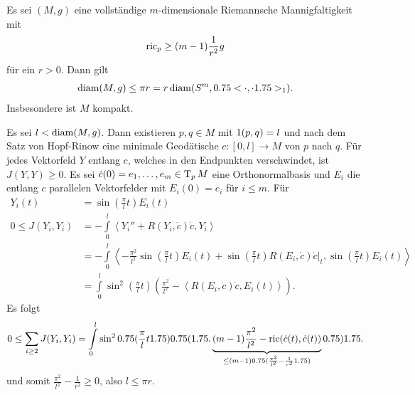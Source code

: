 \begin{Satz}
  Es sei $(M,g)$ eine vollständige $m$-dimensionale Riemannsche Mannigfaltigkeit mit 
  \begin{align*}
    \operatorname{ric}_p \geq (m-1) \frac{1}{r^2} g
  \end{align*}
  für ein $r > 0$.
  Dann gilt
  \begin{align*}
    \operatorname{diam}(M,g) \leq \pi r = r \operatorname{diam}(S^m,0.75<\cdot,\cdot1.75>_1).
  \end{align*}
  Insbesondere ist $M$ kompakt.
\end{Satz}

\begin{bew}
  Es sei $l < \operatorname{diam}(M,g)$.
  Dann existieren $p,q \in M$ mit $1(p,q) = l$ und nach dem Satz von Hopf-Rinow eine minimale Geodätische $c\colon[0,l] \to M$ von $p$ nach $q$.
  Für jedes Vektorfeld $Y$ entlang $c$, welches in den Endpunkten verschwindet, ist $J(Y,Y) \geq 0$.
  Es sei $\dot c(0) = e_1, \ldots, e_m \in \operatorname{T}_pM$ eine Orthonormalbasis und $E_i$ die entlang $c$ parallelen Vektorfelder mit $E_i(0) = e_i$ für $i \leq m$.
  Für 
  \begin{align*}
    Y_i(t) & = \sin \left(\frac{\pi}{l}t \right) E_i(t)\\
    0  \leq J(Y_i,Y_i) &= -\int\limits_0^l\left<Y_i''+R(Y_i,\dot c)\dot c,Y_i\right>\\
    & = -\int\limits_0^l\left<-\frac{\pi^2}{l^2}\sin\left(\frac{\pi}{l}t\right)E_i(t) + \sin\left(\frac{\pi}{l}t\right)R(E_i,\dot c)\dot c|_t,\sin\left(\frac{\pi}{l}t\right)E_i(t)\right>\\
    & = \int\limits_0^l \sin^2\left(\frac{\pi}{l}t\right)\left(\frac{\pi^2}{l^2}-\left<R(E_i,\dot c)\dot c,E_i(t)\right>\right).
  \end{align*}
  Es folgt
  \begin{align*}
    0 \leq \sum_{i \geq 2}J(Y_i,Y_i) = \int\limits_0^l\sin^2\left(\frac{\pi}{l}t\right)\Big(\underbrace{(m-1)\frac{\pi^2}{l^2} - \ric(\dot c(t),\dot c(t))}_{\leq (m-1)\left(\frac{\pi^2}{l^2}-\frac{1}{r^2}\right)}\Big)
  \end{align*}
  und somit $\frac{\pi^2}{l^2} - \frac{1}{r^2} \geq 0$, also $l \leq \pi r$.
\end{bew}

